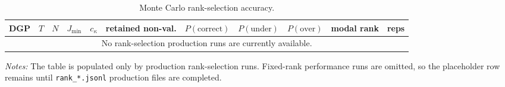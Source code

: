 \begin{table}[!htbp]
\centering\small
\caption{Monte Carlo rank-selection accuracy.}
\label{tab:mc_rank}
\begin{tabular}{lrrrrrrrrlr}
\toprule
DGP & $T$ & $N$ & $J_{\min}$ & $c_\kappa$ & retained non-val. & $P(\mathrm{correct})$ & $P(\mathrm{under})$ & $P(\mathrm{over})$ & modal rank & reps \\
\midrule
\multicolumn{11}{c}{No rank-selection production runs are currently available.}\\
\bottomrule
\end{tabular}
\par\smallskip
{\footnotesize\begin{minipage}{0.92\textwidth}\textit{Notes:} The table is populated only by production rank-selection runs. Fixed-rank performance runs are omitted, so the placeholder row remains until \texttt{rank\_*.jsonl} production files are completed.\end{minipage}}
\end{table}
